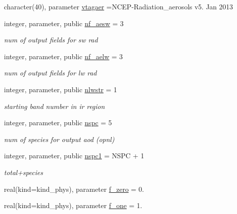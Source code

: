 \begin{DoxyCompactItemize}
\item 
character(40), parameter \hyperlink{namespacemodule__radiation__aerosols_a6d0e0cbcb4a13c1f80f6b1c41b13d3b8}{vtagaer} =\textquotesingle{}N\+C\+EP-\/Radiation\+\_\+aerosols v5. Jan 2013 \textquotesingle{}
\item 
integer, parameter, public \hyperlink{group__module__radiation__aerosols_gae0d9615fa694e2a5dfe8fb48e99b7e76}{nf\+\_\+aesw} = 3
\begin{DoxyCompactList}\small\item\em num of output fields for sw rad \end{DoxyCompactList}\item 
integer, parameter, public \hyperlink{group__module__radiation__aerosols_gafba0069cd611248a9595a126a13f5203}{nf\+\_\+aelw} = 3
\begin{DoxyCompactList}\small\item\em num of output fields for lw rad \end{DoxyCompactList}\item 
integer, parameter, public \hyperlink{group__module__radiation__aerosols_ga654ab60d433133542d3c07edd2244566}{nlwstr} = 1
\begin{DoxyCompactList}\small\item\em starting band number in ir region \end{DoxyCompactList}\item 
integer, parameter, public \hyperlink{group__module__radiation__aerosols_ga3d126c465af80bb698d9d1a288c181bb}{nspc} = 5
\begin{DoxyCompactList}\small\item\em num of species for output aod (opnl) \end{DoxyCompactList}\item 
integer, parameter, public \hyperlink{group__module__radiation__aerosols_ga476c0181513603112dec3f4d2a2ec839}{nspc1} = N\+S\+PC + 1
\begin{DoxyCompactList}\small\item\em total+species \end{DoxyCompactList}\item 
real(kind=kind\+\_\+phys), parameter \hyperlink{group__module__radiation__aerosols_ga7db1adcf476a9a5532230aa11fcc3bb7}{f\+\_\+zero} = 0.
\item 
real(kind=kind\+\_\+phys), parameter \hyperlink{group__module__radiation__aerosols_ga63babe7f9ec4ff6a0364993f4be3768e}{f\+\_\+one} = 1.
\item 

\end{DoxyCompactItemize}
